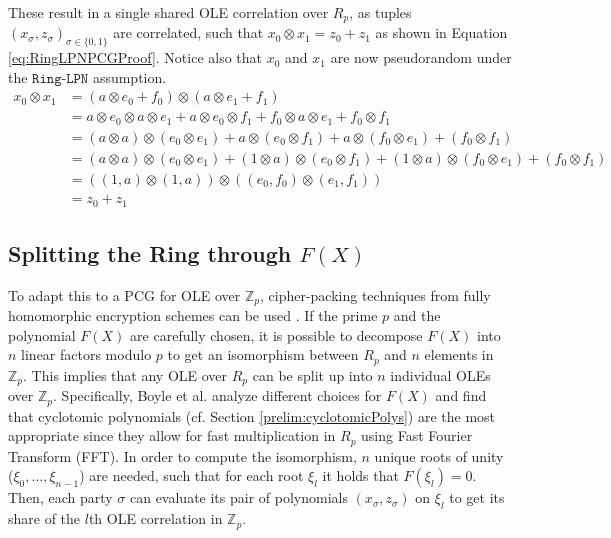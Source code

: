 These result in a single shared OLE correlation over $R_p$, as tuples $(x_\sigma, z_\sigma)_{\sigma\in\{0,1\}}$ are correlated, such that $x_0\otimes x_1 = z_0 + z_1$ as shown in Equation \ref{eq:RingLPNPCGProof}. Notice also that $x_0$ and $x_1$ are now pseudorandom under the $\texttt{Ring-LPN}$ assumption.
\begin{equation}
\begin{aligned}
x_0 \otimes x_1 &= (a \otimes e_0 + f_0) \otimes (a \otimes e_1 + f_1) \\
    &= a \otimes e_0  \otimes a \otimes e_1 + a \otimes e_0 \otimes f_1 + f_0 \otimes a \otimes e_1 + f_0 \otimes f_1 \\
    &= (a \otimes a) \otimes (e_0 \otimes e_1) + a \otimes (e_0 \otimes f_1)  + a \otimes (f_0 \otimes e_1)  + (f_0 \otimes f_1) \\
    &= (a \otimes a) \otimes (e_0 \otimes e_1) + (1 \otimes a) \otimes (e_0 \otimes f_1)  + (1 \otimes a) \otimes (f_0 \otimes e_1)  + (f_0 \otimes f_1) \\
    &= ((1,a) \otimes (1,a)) \otimes ((e_0, f_0) \otimes (e_1, f_1)) \\
    &= z_0 + z_1
\label{eq:RingLPNPCGProof}
\end{aligned}
\end{equation}

\subsection{Splitting the Ring through $F(X)$}
\label{subseq:realtiontofx}
To adapt this to a PCG for OLE over $\mathbb{Z}_p$, cipher-packing techniques from fully homomorphic encryption schemes can be used \cite{smart2014fully}. If the prime $p$ and the polynomial $F(X)$ are carefully chosen, it is possible to decompose $F(X)$ into $n$ linear factors modulo $p$ to get an isomorphism between $R_p$ and $n$ elements in $\mathbb{Z}_p$. This implies that any OLE over $R_p$ can be split up into $n$ individual OLEs over $\mathbb{Z}_p$. Specifically, Boyle et al. \cite{boyle2020efficient} analyze different choices for $F(X)$ and find that cyclotomic polynomials (cf. Section \ref{prelim:cyclotomicPolys}) are the most appropriate since they allow for fast multiplication in $R_p$ using Fast Fourier Transform (FFT). In order to compute the isomorphism, $n$ unique roots of unity ($\xi_0, ...,\xi_{n-1}$) are needed, such that for each root $\xi_l$ it holds that $F(\xi_l)=0$. Then, each party $\sigma$ can evaluate its pair of polynomials $(x_\sigma, z_\sigma)$ on $\xi_l$ to get its share of the $l$th OLE correlation in $\mathbb{Z}_p$.

